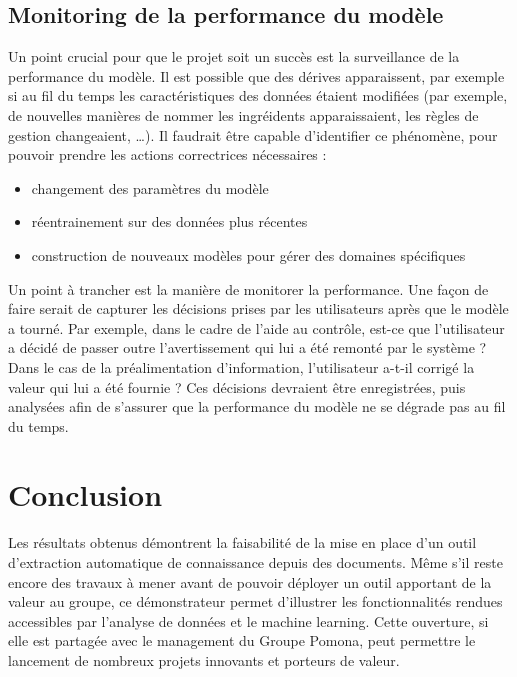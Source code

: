             \subsection{Monitoring de la performance du modèle}

            Un point crucial pour que le projet soit un succès est la surveillance de la performance du modèle.
            Il est possible que des dérives apparaissent, par exemple si au fil du temps les caractéristiques des données étaient modifiées (par exemple, de nouvelles manières de nommer les ingréidents apparaissaient, les règles de gestion changeaient, \dots).
            Il faudrait être capable d'identifier ce phénomène, pour pouvoir prendre les actions correctrices nécessaires : 
            \begin{itemize}
                \item changement des paramètres du modèle
                \item réentrainement sur des données plus récentes
                \item construction de nouveaux modèles pour gérer des domaines spécifiques
            \end{itemize}
            Un point à trancher est la manière de monitorer la performance.
            Une façon de faire serait de capturer les décisions prises par les utilisateurs après que le modèle a tourné.
            Par exemple, dans le cadre de l'aide au contrôle, est-ce que l'utilisateur a décidé de passer outre l'avertissement qui lui a été remonté par le système ?
            Dans le cas de la préalimentation d'information, l'utilisateur a-t-il corrigé la valeur qui lui a été fournie ?
            Ces décisions devraient être enregistrées, puis analysées afin de s'assurer que la performance du modèle ne se dégrade pas au fil du temps.
            
            \section{Conclusion}

            Les résultats obtenus démontrent la faisabilité de la mise en place d'un outil d'extraction automatique de connaissance depuis des documents.
            Même s'il reste encore des travaux à mener avant de pouvoir déployer un outil apportant de la valeur au groupe, ce démonstrateur permet d'illustrer les fonctionnalités rendues accessibles par l'analyse de données et le machine learning.
            Cette ouverture, si elle est partagée avec le management du Groupe Pomona, peut permettre le lancement de nombreux projets innovants et porteurs de valeur.